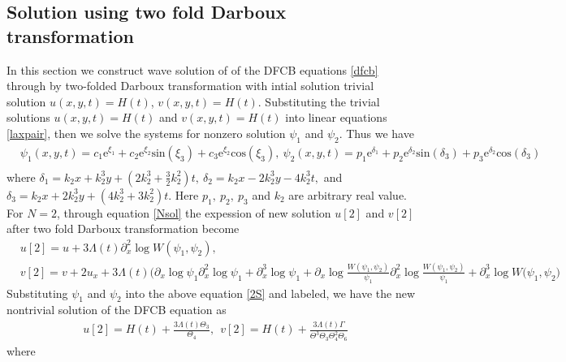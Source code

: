 \documentclass{article}%
\begin{document}
\subsection{Solution using two fold Darboux transformation}
In this section we construct wave solution of  of the DFCB  equations \eqref{dfcb} through by two-folded Darboux transformation with intial solution trivial solution $u(x,y,t)=H(t)$, $v(x,y,t)=H(t)$. Substituting the trivial solutions $u(x,y,t)=H(t)$ and $v(x,y,t)=H(t)$ into linear equations \eqref{laxpair}, then we solve the systems for nonzero solution $\psi_{1}$ and $\psi_{2}$. Thus we have
\begin{equation}
\begin{split}
&\psi_{1}(x,y,t)=c_1\text{e}^{\xi_1}+c_2\text{e}^{\xi_2}\text{sin}(\xi_3)+c_3\text{e}^{\xi_2}\text{cos}(\xi_3),~
\psi_{2}(x,y,t)=p_1\text{e}^{\delta_1}+p_2\text{e}^{\delta_2}\text{sin}(\delta_3)+p_3\text{e}^{\delta_2}\text{cos}(\delta_3)\\
\end{split}
\end{equation}
where $\delta_1=k_2x+k_2^3y+(2k_2^3+\frac{3}{2}k_2^2)t,~ \delta_2=k_2x-2k_2^3y-4k_2^3t,$ and $\delta_3=k_2x+2k_2^3y+(4k_2^3+3k_2^2)t$. Here $p_1, ~p_2,~p_3 $ and $k_2$ are arbitrary real value. For $N=2$, through equation \eqref{Nsol} the expession of new solution $u[2]$ and $v[2]$ after two fold Darboux transformation become
\begin{equation}
\begin{split}
&u[2]=u+3\Lambda(t)\partial^{2}_{x}\log W(\psi_{1},\psi_{2}),\\
&v[2]=v+2u_x+3\Lambda(t)\bigg(\partial_x\log\psi_1\partial^{2}_x\log\psi_1+\partial^{3}_x\log\psi_1  +\partial_x\log \frac{W(\psi_1,\psi_2)}{\psi_1}\partial^{2}_x\log\frac{W(\psi_1,\psi_2)}{\psi_1}+\partial^{3}_x\log W(\psi_1,\psi_2\bigg)\label{2S}
\end{split}
\end{equation}
Substituting $\psi_1$ and $\psi_2$ into the above equation \eqref{2S} and labeled, we have the new nontrivial solution of the DFCB equation as
\begin{equation}
\begin{split}
&u[2]=H(t)+\frac{3\Lambda(t)\Theta_3}{\Theta_4},~~
v[2]=H(t)+\frac{3\Lambda(t)\Gamma}{\Theta^3\Theta_3\Theta_4^2\Theta_6}
\end{split}
\end{equation}
where
\end{document}
